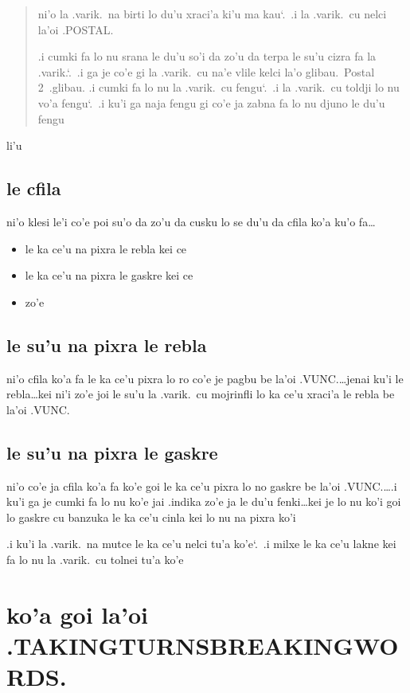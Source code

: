 \documentclass{report}
\newcommand\sds{\spacefactor\sfcode`.\ \space}
\begin{document}
\begin{quote}
	ni'o la .varik.\ na birti lo du'u xraci'a ki'u ma kau\sds  .i la .varik.\ cu nelci la'oi .POSTAL.

	.i cumki fa lo nu srana le du'u so'i da zo'u da terpa le su'u cizra fa la .varik.\sds  .i ga je co'e gi la .varik.\ cu na'e vlile kelci la'o glibau.\ Postal 2\ .glibau.
	.i cumki fa lo nu la .varik.\ cu fengu\sds  .i la .varik.\ cu toldji lo nu vo'a fengu\sds  .i ku'i ga naja fengu gi co'e ja zabna fa lo nu djuno le du'u fengu
\end{quote}

li'u

\section{le cfila}
ni'o klesi le'i co'e poi su'o da zo'u da cusku lo se du'u da cfila ko'a ku'o fa\ldots

\begin{itemize}
	\item le ka ce'u na pixra le rebla kei ce
	\item le ka ce'u na pixra le gaskre kei ce
	\item zo'e
\end{itemize}

\section{le su'u na pixra le rebla}
ni'o cfila ko'a fa le ka ce'u pixra lo ro co'e je pagbu be la'oi .VUNC.\ldots jenai ku'i le rebla\ldots kei ni'i zo'e joi le su'u la .varik.\ cu mojrinfli lo ka ce'u xraci'a le rebla be la'oi .VUNC.

\section{le su'u na pixra le gaskre}
ni'o co'e ja cfila ko'a fa ko'e goi le ka ce'u pixra lo no gaskre be la'oi .VUNC.\ldots  .i ku'i ga je cumki fa lo nu ko'e jai .indika zo'e ja le du'u fenki\ldots kei je lo nu ko'i goi lo gaskre cu banzuka le ka ce'u cinla kei lo nu na pixra ko'i

.i ku'i la .varik.\ na mutce le ka ce'u nelci tu'a ko'e\sds  .i milxe le ka ce'u lakne kei fa lo nu la .varik.\ cu tolnei tu'a ko'e

\chapter{ko'a goi la'oi .TAKINGTURNSBREAKINGWORDS.}
\end{document}
